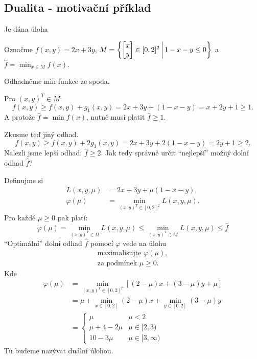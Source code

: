 \subsection{Dualita - motivační příklad}
Je dána úloha

Označme $f(x,y) = 2x + 3y$,
$
    M = \left\lbrace 
    \begin{bmatrix}
        x \\
        y
    \end{bmatrix} \in [0,2]^2 \, \middle| \, 1 - x - y \leq 0 \right\rbrace
$
a $\hat f = \min_{x\in M} f(x)$.

Odhadněme min funkce ze spoda. 

Pro $(x, y)^T \in M$: \[f(x, y) \geq f(x,y) + g_1(x,y) = 2x + 3y + (1-x-y) = x+2y+1 \geq 1.\]
A protože $\hat f = \min f(x)$, nutně musí platit $\hat f \geq 1$.

Zkusme teď jiný odhad.
\[f(x, y) \geq f(x,y) + 2g_1(x,y) = 2x + 3y + 2(1-x-y) = 2y + 1 \geq 2.\]
Nalezli jsme lepší odhad: $\hat f \geq 2$. Jak tedy správně určit \enquote{nejlepší} možný dolní odhad $\hat f$?

Definujme si
\begin{align*}
    L(x, y, \mu) &= 2x + 3y + \mu(1-x-y), \\
    \varphi(\mu) &= \min_{(x, y)^T \in [0,2]^2}L(x, y, \mu).
\end{align*}
Pro každé $\mu \geq 0$ pak platí:
\[
    \varphi(\mu) = \min_{(x, y)^T \in \Omega}L(x, y, \mu) \leq \min_{(x, y)^T \in M}L(x, y, \mu) \leq \hat f
\]
\enquote{Optimální} dolní odhad $\hat f$ pomocí $\varphi$ vede na úlohu
\begin{align*}
    \text{maximalisujte } \varphi(\mu), \\
    \text{za podmínek } \mu \geq 0.
\end{align*}
Kde
\begin{align*}
    \varphi(\mu) &= \min_{(x, y)^T \in [0,2]^T} \left[(2-\mu)x + (3-\mu)y + \mu\right] \\
    &= \mu + \min_{x \in [0,2]}(2-\mu)x + \min_{y \in [0,2]}(3-\mu)y \\
    &= 
    \begin{cases}
        \mu & \mu < 2 \\
        \mu + 4 - 2\mu & \mu \in [2, 3) \\
        10 - 3\mu & \mu \in [3, \infty)
    \end{cases}
\end{align*}
Tu budeme nazývat duální úlohou.

